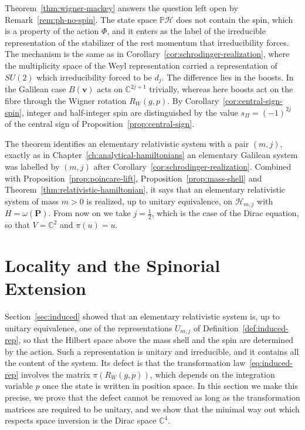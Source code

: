 	\begin{remark}\label{rem:spin-emerges}
		Theorem~\ref{thm:wigner-mackey} answers the question left open by Remark~\ref{rem:ph-no-spin}. The state space $\mathbb{P}\mathcal{H}$ does not contain the spin, which is a property of the action $\Phi$, and it enters as the label of the irreducible representation of the stabilizer of the rest momentum that irreducibility forces. The mechanism is the same as in Corollary~\ref{cor:schrodinger-realization}, where the multiplicity space of the Weyl representation carried a representation of $SU(2)$ which irreducibility forced to be $d_j$. The difference lies in the boosts. In the Galilean case $B(\mathbf{v})$ acts on $\mathbb{C}^{2j+1}$ trivially, whereas here boosts act on the fibre through the Wigner rotation $R_W(g,p)$. By Corollary~\ref{cor:central-sign-spin}, integer and half-integer spin are distinguished by the value $s_\Pi=(-1)^{2j}$ of the central sign of Proposition~\ref{prop:central-sign}.
	\end{remark}
	
	\begin{remark}\label{rem:spin-half}
		The theorem identifies an elementary relativistic system with a pair $(m,j)$, exactly as in Chapter~\ref{ch:analytical-hamiltonians} an elementary Galilean system was labelled by $(m,j)$ after Corollary~\ref{cor:schrodinger-realization}. Combined with Proposition~\ref{prop:poincare-lift}, Proposition~\ref{prop:mass-shell} and Theorem~\ref{thm:relativistic-hamiltonian}, it says that an elementary relativistic system of mass $m>0$ is realized, up to unitary equivalence, on $\mathcal{H}_{m,j}$ with $H=\omega(\mathbf{P})$. From now on we take $j=\frac12$, which is the case of the Dirac equation, so that $V=\mathbb{C}^2$ and $\pi(u)=u$.
	\end{remark}
	
	\section{Locality and the Spinorial Extension}
	\label{sec:locality}
	
	Section~\ref{sec:induced} showed that an elementary relativistic system is, up to unitary equivalence, one of the representations $U_{m,j}$ of Definition~\ref{def:induced-rep}, so that the Hilbert space above the mass shell and the spin are determined by the action. Such a representation is unitary and irreducible, and it contains all the content of the system. Its defect is that the transformation law~\eqref{eq:induced-rep} involves the matrix $\pi(R_W(g,p))$, which depends on the integration variable $p$ once the state is written in position space. In this section we make this precise, we prove that the defect cannot be removed as long as the transformation matrices are required to be unitary, and we show that the minimal way out which respects space inversion is the Dirac space $\mathbb{C}^4$.
	
